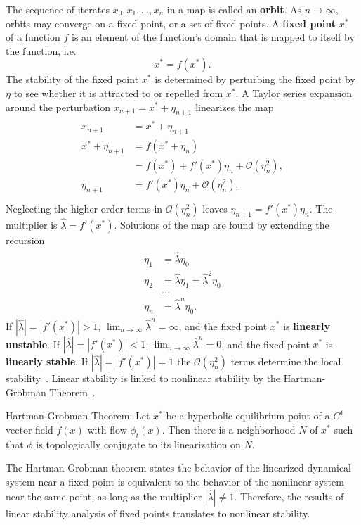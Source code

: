 The sequence of iterates ${x_0,x_1,...,x_n}$ in a map is
called an \textbf{orbit}. As $n \to \infty$, orbits may converge on a fixed point, or a
set of fixed points. A \textbf{fixed point} $x^*$ of a function $f$ is an element of the
function's domain that is mapped to itself by the function, i.e.
\begin{equation*}
x^* = f(x^*).
\end{equation*}
The stability of the fixed point $x^*$ is
determined by perturbing the fixed point by $\eta$ to see whether it is
attracted to or repelled from $x^*$. A Taylor series expansion around
the perturbation $x_{n+1} = x^* + \eta_{n+1}$ linearizes the map
\begin{align*}
\begin{split}
x_{n+1} &= x^* + \eta_{n+1}\\
x^* + \eta_{n+1} &= f(x^* + \eta_n)\\
&= f(x^*) + f'(x^*)\eta_n + \mathcal{O}(\eta_n^2),\\
\eta_{n+1} &= f'(x^*)\eta_n + \mathcal{O}(\eta_n^2).\\
\end{split}
\end{align*}
Neglecting the higher order terms in $\mathcal{O}(\eta_n^2)$ leaves
$\eta_{n+1} = f'(x^*)\eta_n$. The multiplier is $\hat{\lambda} =
f'(x^*)$. Solutions of the map are found by extending the recursion
\begin{align*}
\begin{split}
\eta_{1} &= \hat{\lambda}\eta_0\\
\eta_{2} &= \hat{\lambda}\eta_1 = \hat{\lambda}^2\eta_0\\
&...\\
\eta_{n} &=\hat{\lambda}^n\eta_0.
\end{split}
\end{align*}
If $|\hat{\lambda}| = |f'(x^*)| > 1$, $\lim_{n \to \infty}\hat{\lambda}^n = \infty$, and
the fixed point $x^*$ is \textbf{linearly unstable}. If $|\hat{\lambda}| = |f'(x^*)| < 1$, $\lim_{n \to
  \infty}\hat{\lambda}^n = 0$, and the fixed point $x^*$ is
\textbf{linearly stable}. If
$|\hat{\lambda}| = |f'(x^*)| = 1$ the $\mathcal{O}(\eta_n^2)$ terms
determine the local stability~\cite{strogatz}. Linear stability is
linked to nonlinear stability by the Hartman-Grobman Theorem~\cite{meiss}.
\begin{singlespace}
\begin{theorem}
Hartman-Grobman Theorem: Let $x^*$ be a hyperbolic equilibrium point of a $C^1$
vector field $f(x)$ with flow $\phi_t(x)$. Then there is a
neighborhood $N$ of $x^*$ such that $\phi$ is topologically conjugate to its linearization on $N$.
\end{theorem}
\end{singlespace}
The Hartman-Grobman theorem states the behavior of the linearized
dynamical system near a fixed point is equivalent to the
behavior of the nonlinear system near the same point, as long as the
multiplier $|\hat{\lambda}|\neq 1$. Therefore, the results of linear stability
analysis of fixed points translates to nonlinear stability. 

